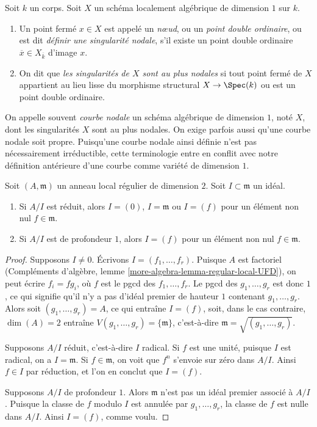 \begin{definition}
\label{definition-nodal}
Soit $k$ un corps. Soit $X$ un schéma localement algébrique de dimension $1$ sur $k$. \begin{enumerate} \item Un point fermé $x \in X$ est appelé un {\it nœud}, ou un {\it point double ordinaire}, ou est dit {\it définir une singularité nodale}, s'il existe un point double ordinaire $\overline{x} \in X_{\overline{k}}$ d'image $x$. \item On dit que {\it les singularités de $X$ sont au plus nodales} si tout point fermé de $X$ appartient au lieu lisse du morphisme structural $X \to \Spec(k)$ ou est un point double ordinaire.
\end{enumerate}
\end{definition}

\noindent
On appelle souvent {\it courbe nodale} un schéma algébrique de dimension $1$, noté $X$, dont les singularités $X$ sont au plus nodales. On exige parfois aussi qu'une courbe nodale soit propre. Puisqu'une courbe nodale ainsi définie n'est pas nécessairement irréductible, cette terminologie entre en conflit avec notre définition antérieure d'une courbe comme variété de dimension $1$.

\begin{lemma}
\label{lemma-reduced-quotient-regular-ring-dim-2}
Soit $(A, \mathfrak m)$ un anneau local régulier de dimension $2$. Soit $I \subset \mathfrak m$ un idéal. \begin{enumerate} \item Si $A/I$ est réduit, alors $I = (0)$, $I = \mathfrak m$ ou $I = (f)$ pour un élément non nul $f \in \mathfrak m$. \item Si $A/I$ est de profondeur $1$, alors $I = (f)$ pour un élément non nul $f \in \mathfrak m$. 
\end{enumerate}
\end{lemma}

\begin{proof}
Supposons $I \not = 0$. Écrivons $I = (f_1, \ldots, f_r)$. Puisque $A$ est factoriel (Compléments d'algèbre, lemme \ref{more-algebra-lemma-regular-local-UFD}), on peut écrire $f_i = fg_i$, où $f$ est le pgcd des $f_1, \ldots, f_r$. Le pgcd des $g_1, \ldots, g_r$ est donc $1$, ce qui signifie qu'il n'y a pas d'idéal premier de hauteur $1$ contenant $g_1, \ldots, g_r$. Alors soit $(g_1, \ldots, g_r) = A$, ce qui entraîne $I = (f)$, soit, dans le cas contraire, $\dim(A) = 2$ entraîne $V(g_1, \ldots, g_r) = \{\mathfrak m\}$, c'est-à-dire $\mathfrak m = \sqrt{(g_1, \ldots, g_r)}$.

\medskip\noindent
Supposons $A/I$ réduit, c'est-à-dire $I$ radical. Si $f$ est une unité, puisque $I$ est radical, on a $I = \mathfrak m$. Si $f \in \mathfrak m$, on voit que $f^n$ s'envoie sur zéro dans $A/I$. Ainsi $f \in I$ par réduction, et l'on en conclut que $I = (f)$.

\medskip\noindent
Supposons $A/I$ de profondeur $1$. Alors $\mathfrak m$ n'est pas un idéal premier associé à $A/I$. Puisque la classe de $f$ modulo $I$ est annulée par $g_1, \ldots, g_r$, la classe de $f$ est nulle dans $A/I$. Ainsi $I = (f)$, comme voulu.
\end{proof}

